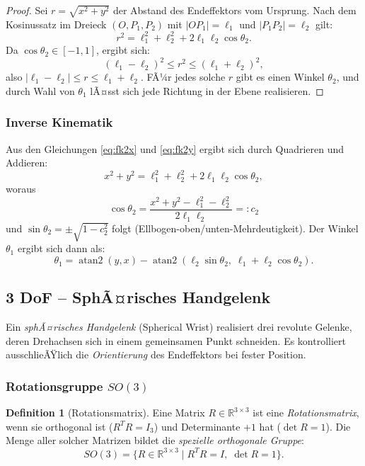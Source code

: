 ﻿\documentclass[a4paper,12pt]{article}
\theoremstyle{definition}
\newtheorem{definition}{Definition}
\begin{document}
\begin{proof}
	Sei $r = \sqrt{x^2 + y^2}$ der Abstand des Endeffektors vom Ursprung. Nach dem Kosinussatz im Dreieck $(O, P_1, P_2)$ mit $|OP_1| = \ell_1$ und $|P_1 P_2| = \ell_2$ gilt:
	\[
		r^2 = \ell_1^2 + \ell_2^2 + 2\ell_1\ell_2\cos\theta_2.
	\]
	Da $\cos\theta_2 \in [-1, 1]$, ergibt sich:
	\[
		(\ell_1 - \ell_2)^2 \leq r^2 \leq (\ell_1 + \ell_2)^2,
	\]
	also $|\ell_1 - \ell_2| \leq r \leq \ell_1 + \ell_2$. FÃ¼r jedes solche $r$ gibt es einen Winkel $\theta_2$, und durch Wahl von $\theta_1$ lÃ¤sst sich jede Richtung in der Ebene realisieren. \qedhere
\end{proof}

\subsubsection{Inverse Kinematik}

Aus den Gleichungen \eqref{eq:fk2x} und \eqref{eq:fk2y} ergibt sich durch Quadrieren und Addieren:
\[
	x^2 + y^2 = \ell_1^2 + \ell_2^2 + 2\ell_1\ell_2\cos\theta_2,
\]
woraus
\[
	\cos\theta_2 = \frac{x^2 + y^2 - \ell_1^2 - \ell_2^2}{2\ell_1\ell_2} =: c_2
\]
und $\sin\theta_2 = \pm\sqrt{1 - c_2^2}$ folgt (Ellbogen-oben/unten-Mehrdeutigkeit). Der Winkel $\theta_1$ ergibt sich dann als:
\[
	\theta_1 = \operatorname{atan2}(y, x) - \operatorname{atan2}(\ell_2 \sin\theta_2,\; \ell_1 + \ell_2 \cos\theta_2).
\]

\subsection{3 DoF -- SphÃ¤risches Handgelenk}

Ein \emph{sphÃ¤risches Handgelenk} (Spherical Wrist) realisiert drei revolute Gelenke, deren Drehachsen sich in einem gemeinsamen Punkt schneiden. Es kontrolliert ausschlieÃŸlich die \emph{Orientierung} des Endeffektors bei fester Position.

\subsubsection{Rotationsgruppe $SO(3)$}

\begin{definition}[Rotationsmatrix]
	Eine Matrix $R \in \mathbb{R}^{3\times 3}$ ist eine \emph{Rotationsmatrix}, wenn sie orthogonal ist ($R^T R = I_3$) und Determinante $+1$ hat ($\det R = 1$). Die Menge aller solcher Matrizen bildet die \emph{spezielle orthogonale Gruppe}:
	\[
		SO(3) = \{R \in \mathbb{R}^{3\times 3} \mid R^T R = I,\; \det R = 1\}.
	\]
\end{definition}
\end{document}

